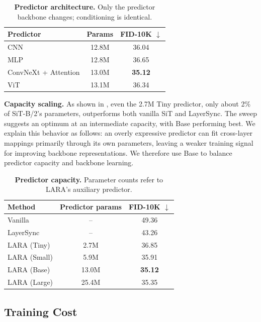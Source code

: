 \begin{table}[!htbp]
\centering
\caption{\textbf{Predictor architecture.} Only the predictor backbone changes; conditioning is identical.}
\label{tab:predictor_architecture_ablation}
\small
\setlength{\tabcolsep}{4pt}
\begin{tabular}{@{}lcc@{}}
\toprule
Predictor & Params & FID-10K $\downarrow$ \\
\midrule
CNN & 12.8M & 36.04 \\
MLP & 12.8M & 36.65 \\
ConvNeXt + Attention & 13.0M & \textbf{35.12} \\
ViT & 13.1M & 36.34 \\
\bottomrule
\end{tabular}
\end{table}

\textbf{Capacity scaling.} As shown in , even the 2.7M Tiny predictor, only about 2\% of SiT-B/2's parameters, outperforms both vanilla SiT and LayerSync. The sweep suggests an optimum at an intermediate capacity, with Base performing best. We explain this behavior as follows: an overly expressive predictor can fit cross-layer mappings primarily through its own parameters, leaving a weaker training signal for improving backbone representations. We therefore use Base to balance predictor capacity and backbone learning.

\begin{table}[!htbp]
\centering
\caption{\textbf{Predictor capacity.} Parameter counts refer to LARA's auxiliary predictor.}
\label{tab:main_predictor_size_ablation}
\small
\setlength{\tabcolsep}{4pt}
\begin{tabular}{@{}lcc@{}}
\toprule
Method & Predictor params & FID-10K $\downarrow$ \\
\midrule
Vanilla & -- & 49.36 \\
LayerSync & -- & 43.26 \\
\midrule
LARA (Tiny) & 2.7M & 36.85 \\
LARA (Small) & 5.9M & 35.91 \\
LARA (Base) & 13.0M & \textbf{35.12} \\
LARA (Large) & 25.4M & 35.35 \\
\bottomrule
\end{tabular}
\end{table}

\subsection{Training Cost}
\label{sec:training_cost}

